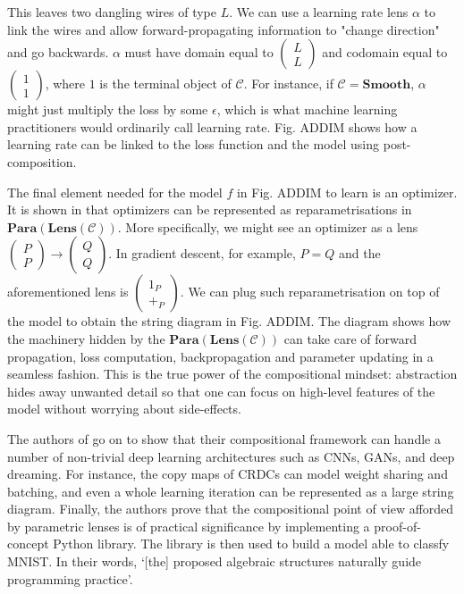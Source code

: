 \documentclass[12pt,a4paper,openright,twoside]{report}
\theoremstyle{plain}
\theoremstyle{definition}
\begin{document}
This leaves two dangling wires of type $L$. We can use a learning rate lens $\alpha$ to link the wires and allow forward-propagating information to "change direction" and go backwards. $\alpha$ must have domain equal to $\left( \begin{smallmatrix} L \\ L \end{smallmatrix} \right)$ and codomain equal to $\left(\begin{smallmatrix} 1 \\ 1 \end{smallmatrix}\right)$, where $1$ is the terminal object of $\mathcal{C}$. For instance, if $\mathcal{C} = \mathbf{Smooth}$, $\alpha$ might just multiply the loss by some $\epsilon$, which is what machine learning practitioners would ordinarily call learning rate. Fig. ADDIM shows how a learning rate can be linked to the loss function and the model using post-composition.


The final element needed for the model $f$ in Fig. ADDIM to learn is an optimizer. It is shown in \cite{cruttwellDeepLearningParametric} that optimizers can be represented as reparametrisations in $\mathbf{Para}(\mathbf{Lens}(\mathcal{C}))$. More specifically, we might see an optimizer as a lens $\left( \begin{smallmatrix} P \\ P \end{smallmatrix} \right) \to \left( \begin{smallmatrix} Q \\ Q \end{smallmatrix} \right)$. In gradient descent, for example, $P = Q$ and the aforementioned lens is $\left( \begin{smallmatrix} 1_P \\ +_P \end{smallmatrix} \right)$. We can plug such reparametrisation on top of the model to obtain the string diagram in Fig. ADDIM. The diagram shows how the machinery hidden by the $\mathbf{Para}(\mathbf{Lens}(\mathcal{C}))$ can take care of forward propagation, loss computation, backpropagation and parameter updating in a seamless fashion. This is the true power of the compositional mindset: abstraction hides away unwanted detail so that one can focus on high-level features of the model without worrying about side-effects.


The authors of \cite{cruttwellDeepLearningParametric} go on to show that their compositional framework can handle a number of non-trivial deep learning architectures such as CNNs, GANs, and deep dreaming. For instance, the copy maps of CRDCs can model weight sharing and batching, and even a whole learning iteration can be represented as a large string diagram. Finally, the authors prove that the compositional point of view afforded by parametric lenses is of practical significance by implementing a proof-of-concept Python library. The library is then used to build a model able to classfy MNIST. In their words, \lq[the] proposed algebraic structures naturally guide programming practice\rq.
\end{document}
